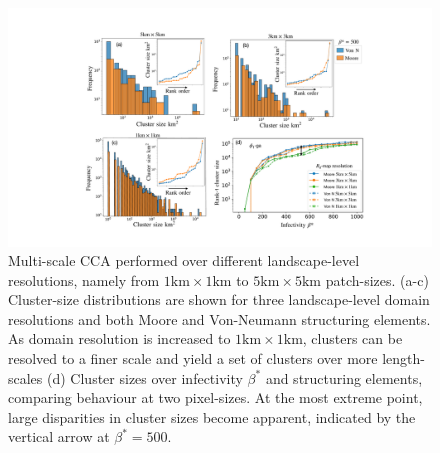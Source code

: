 \begin{figure}
    \centering
    \includegraphics[scale=0.375]{chapter6/figures/fig6A-ga-cluster-distribution.pdf}
    \caption{
    Multi-scale CCA performed over different landscape-level resolutions, namely from $\mathrm{1km \times 1km}$ to $\mathrm{5km \times 5km}$ patch-sizes. 
    (a-c) Cluster-size distributions are shown for three landscape-level domain resolutions and both Moore and Von-Neumann structuring elements. 
    As domain resolution is increased to $\mathrm{1km \times 1km}$, clusters can be resolved to a finer scale and yield a set of clusters over more length-scales 
    (d) Cluster sizes over infectivity $\beta^*$ and structuring elements, comparing behaviour at two pixel-sizes. 
    At the most extreme point, large disparities in cluster sizes become apparent, indicated by the vertical arrow at $\beta^*=500$.}
    \label{fig:gaussian-clustering-A}
\end{figure}

